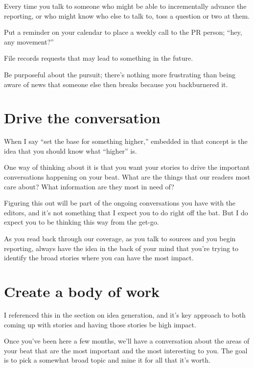 \documentclass[
  11pt,
  american,
  letterpaperpaper,
  extrafontsizes,onecolumn,openright
  ]{memoir}
\begin{document}
Every time you talk to someone who might be able to incrementally advance the reporting, or who might know who else to talk to, toss a question or two at them.

Put a reminder on your calendar to place a weekly call to the PR person; \enquote{hey, any movement?}

File records requests that may lead to something in the future.

Be purposeful about the pursuit; there's nothing more frustrating than being aware of news that someone else then breaks because you backburnered it.

\hypertarget{drive-the-conversation}{%
\section*{Drive the conversation}\label{drive-the-conversation}}

When I say \enquote{set the base for something higher,} embedded in that concept is the idea that you should know what \enquote{higher} is.

One way of thinking about it is that you want your stories to drive the important conversations happening on your beat. What are the things that our readers most care about? What information are they most in need of?

Figuring this out will be part of the ongoing conversations you have with the editors, and it's not something that I expect you to do right off the bat. But I do expect you to be thinking this way from the get-go.

As you read back through our coverage, as you talk to sources and you begin reporting, always have the idea in the back of your mind that you're trying to identify the broad stories where you can have the most impact.

\hypertarget{create-a-body-of-work}{%
\section*{Create a body of work}\label{create-a-body-of-work}}

I referenced this in the section on idea generation, and it's key approach to both coming up with stories and having those stories be high impact.

Once you've been here a few months, we'll have a conversation about the areas of your beat that are the most important and the most interesting to you. The goal is to pick a somewhat broad topic and mine it for all that it's worth.
\end{document}
